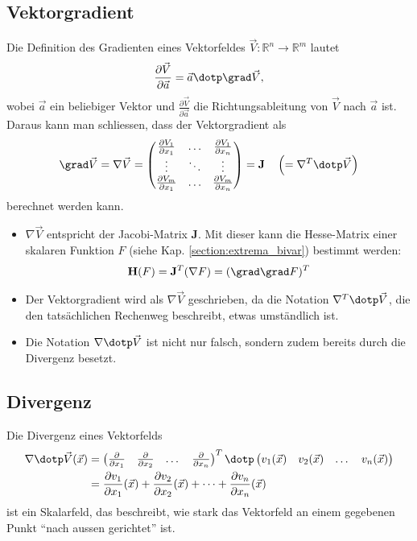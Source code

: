 \subsection{Vektorgradient}
Die Definition des Gradienten eines Vektorfeldes $\vec{V}: \mathbb{R}^n \to \mathbb{R}^m$ lautet
\[ \frac{\partial \vec{V}}{\partial \vec{a}} = \vec{a} \dotp \grad \vec{V}, \]
wobei $\vec{a}$ ein beliebiger Vektor und $\frac{\partial \vec{V}}{\partial \vec{a}}$ die Richtungsableitung von $\vec{V}$ nach $\vec{a}$ ist.
Daraus kann man schliessen, dass der Vektorgradient als
\[ 
    \grad \vec{V} 
    = \nabla \vec{V}
    = \begin{pmatrix}
        \frac{\partial V_1}{\partial x_1} & \hdots & \frac{\partial V_1}{\partial x_n} \\
        \vdots & \ddots & \vdots \\
        \frac{\partial V_m}{\partial x_1} & \hdots & \frac{\partial V_m}{\partial x_n} \\
    \end{pmatrix} 
    = \mathbf{J}
    \hspace{1em} \left(= \nabla^T \dotp \vec{V}\right)
\]
berechnet werden kann.
\begin{itemize}
    \item $\nabla \vec{V}$ entspricht der Jacobi-Matrix $\mathbf{J}$. 
          Mit dieser kann die Hesse-Matrix einer skalaren Funktion $F$ (siehe Kap. \ref{section:extrema_bivar}) bestimmt werden: \[ \mathbf{H}(F) = \mathbf{J}^T(\nabla F) = (\grad \grad F)^T \]
    \item Der Vektorgradient wird als $\nabla \vec{V}$ geschrieben, da die Notation $\nabla^T \dotp \vec{V}$, die den tatsächlichen Rechenweg beschreibt, etwas umständlich ist.
    \item Die Notation $\nabla \dotp \vec{V}$ ist nicht nur falsch, sondern zudem bereits durch die Divergenz besetzt.
\end{itemize}

\subsection{Divergenz}
Die Divergenz eines Vektorfelds
\[
\begin{aligned}
    \nabla \dotp \vec{V}(\vec{x})
    &= \begin{pmatrix} \frac{\partial}{\partial x_1} & \frac{\partial}{\partial x_2} & \dots & \frac{\partial}{\partial x_n} \end{pmatrix}^T \dotp \begin{pmatrix} v_1(\vec{x}) & v_2(\vec{x}) & \dots & v_n(\vec{x}) \end{pmatrix} \\
    &= \frac{\partial v_1}{\partial x_1}(\vec{x}) + \frac{\partial v_2}{\partial x_2}(\vec{x}) + \dots + \frac{\partial v_n}{\partial x_n}(\vec{x})
\end{aligned}
\]
ist ein Skalarfeld, das beschreibt, wie stark das Vektorfeld an einem gegebenen Punkt ``nach aussen gerichtet'' ist. 

